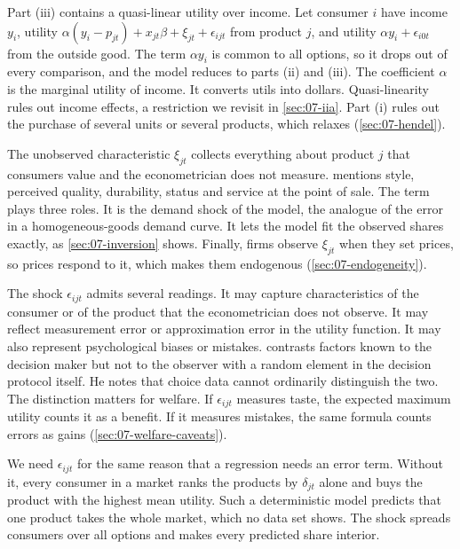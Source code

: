 Part (iii) contains a quasi-linear utility over income. Let consumer $i$ have income $y_i$, utility
$\alpha(y_i - p_{jt}) + x_{jt}\beta + \xi_{jt} + \epsilon_{ijt}$ from product $j$, and utility
$\alpha y_i + \epsilon_{i0t}$ from the outside good. The term $\alpha y_i$ is common to all options, so it
drops out of every comparison, and the model reduces to parts (ii) and (iii). The coefficient $\alpha$ is the
marginal utility of income. It converts utils into dollars. Quasi-linearity rules out income effects, a
restriction we revisit in \cref{sec:07-iia}. Part (i) rules out the purchase of several units or several
products, which \citet{Hendel1999} relaxes (\cref{sec:07-hendel}).

The unobserved characteristic $\xi_{jt}$ collects everything about product $j$ that consumers value and the
econometrician does not measure. \citet[p.~243]{Berry1994} mentions style, perceived quality, durability,
status and service at the point of sale. The term plays three roles. It is the demand shock of the model, the
analogue of the error in a homogeneous-goods demand curve. It lets the model fit the observed shares exactly,
as \cref{sec:07-inversion} shows. Finally, firms observe $\xi_{jt}$ when they set prices, so prices respond to
it, which makes them endogenous (\cref{sec:07-endogeneity}).

The shock $\epsilon_{ijt}$ admits several readings. It may capture characteristics of the consumer or of the
product that the econometrician does not observe. It may reflect measurement error or approximation error in
the utility function. It may also represent psychological biases or mistakes. \citet[p.~1412]{McFadden1984}
contrasts factors known to the decision maker but not to the observer with a random element in the decision
protocol itself. He notes that choice data cannot ordinarily distinguish the two. The distinction matters for
welfare. If $\epsilon_{ijt}$ measures taste, the expected maximum utility counts it as a benefit. If it
measures mistakes, the same formula counts errors as gains (\cref{sec:07-welfare-caveats}).

We need $\epsilon_{ijt}$ for the same reason that a regression needs an error term. Without it, every
consumer in a market ranks the products by $\delta_{jt}$ alone and buys the product with the highest mean
utility. Such a deterministic model predicts that one product takes the whole market, which no data set shows.
The shock spreads consumers over all options and makes every predicted share interior.

